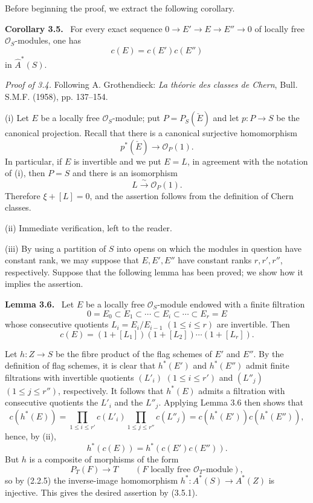 \documentclass[11pt]{article}
\newenvironment{statement}[1]{\par\medskip\noindent\textbf{#1.}\ }{\par\medskip}
\begin{document}
Before beginning the proof, we extract the following corollary.

\begin{statement}{Corollary 3.5}
For every exact sequence $0\to E'\to E\to E''\to0$ of locally free $\mathcal O_S$-modules, one has
\[
c(E)=c(E')c(E'')
\]
in $\widehat A^*(S)$.
\end{statement}

\emph{Proof of 3.4.} Following A. Grothendieck: \emph{La théorie des classes de Chern}, Bull. S.M.F. (1958), pp. 137--154.

(i) Let $E$ be a locally free $\mathcal O_S$-module; put $P=P_S(\check E)$ and let $p:P\to S$ be the canonical projection. Recall that there is a canonical surjective homomorphism
\[
p^*(\check E)\longrightarrow \mathcal O_P(1).
\]
In particular, if $E$ is invertible and we put $E=L$, in agreement with the notation of (i), then $P=S$ and there is an isomorphism
\[
L\xrightarrow{\sim}\mathcal O_P(1).
\]
Therefore $\xi+[L]=0$, and the assertion follows from the definition of Chern classes.

(ii) Immediate verification, left to the reader.

(iii) By using a partition of $S$ into opens on which the modules in question have constant rank, we may suppose that $E,E',E''$ have constant ranks $r,r',r''$, respectively. Suppose that the following lemma has been proved; we show how it implies the assertion.

\begin{statement}{Lemma 3.6}
Let $E$ be a locally free $\mathcal O_S$-module endowed with a finite filtration
\[
0=E_0\subset E_1\subset\cdots\subset E_i\subset\cdots\subset E_r=E
\]
whose consecutive quotients $L_i=E_i/E_{i-1}$ $(1\le i\le r)$ are invertible. Then
\[
c(E)=(1+[L_1])(1+[L_2])\cdots(1+[L_r]).
\]
\end{statement}

Let $h:Z\to S$ be the fibre product of the flag schemes of $E'$ and $E''$. By the definition of flag schemes, it is clear that $h^*(E')$ and $h^*(E'')$ admit finite filtrations with invertible quotients $(L'_i)$ $(1\le i\le r')$ and $(L''_j)$ $(1\le j\le r'')$, respectively. It follows that $h^*(E)$ admits a filtration with consecutive quotients the $L'_i$ and the $L''_j$. Applying Lemma 3.6 then shows that
\[
c(h^*(E))=
\prod_{1\le i\le r'}c(L'_i)\prod_{1\le j\le r''}c(L''_j)
=c(h^*(E'))c(h^*(E'')),
\]
hence, by (ii),
\[
h^*(c(E))=h^*(c(E')c(E'')).
\tag{3.5.1}
\]
But $h$ is a composite of morphisms of the form
\[
P_T(F)\longrightarrow T
\qquad (F\text{ locally free }\mathcal O_T\text{-module}),
\]
so by (2.2.5) the inverse-image homomorphism $h^*:A^*(S)\to A^*(Z)$ is injective. This gives the desired assertion by (3.5.1).
\end{document}
